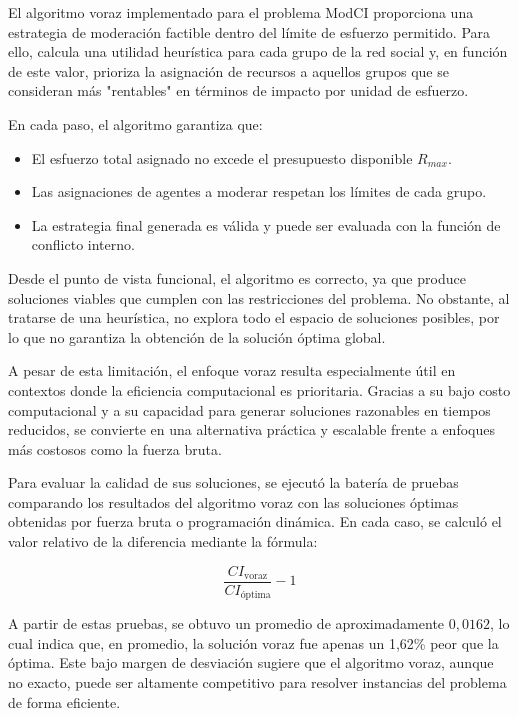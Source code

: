 \documentclass[11pt,letter]{article}
\begin{document}
    El algoritmo voraz implementado para el problema ModCI proporciona una estrategia de moderación factible dentro del límite de esfuerzo permitido. Para ello, calcula una utilidad heurística para cada grupo de la red social y, en función de este valor, prioriza la asignación de recursos a aquellos grupos que se consideran más "rentables" en términos de impacto por unidad de esfuerzo.

    En cada paso, el algoritmo garantiza que:
    \begin{itemize}
        \item El esfuerzo total asignado no excede el presupuesto disponible $R_{max}$.
        \item Las asignaciones de agentes a moderar respetan los límites de cada grupo.
        \item La estrategia final generada es válida y puede ser evaluada con la función de conflicto interno.
    \end{itemize}

    Desde el punto de vista funcional, el algoritmo es correcto, ya que produce soluciones viables que cumplen con las restricciones del problema. No obstante, al tratarse de una heurística, no explora todo el espacio de soluciones posibles, por lo que no garantiza la obtención de la solución óptima global.

    A pesar de esta limitación, el enfoque voraz resulta especialmente útil en contextos donde la eficiencia computacional es prioritaria. Gracias a su bajo costo computacional y a su capacidad para generar soluciones razonables en tiempos reducidos, se convierte en una alternativa práctica y escalable frente a enfoques más costosos como la fuerza bruta.

    Para evaluar la calidad de sus soluciones, se ejecutó la batería de pruebas comparando los resultados del algoritmo voraz con las soluciones óptimas obtenidas por fuerza bruta o programación dinámica. En cada caso, se calculó el valor relativo de la diferencia mediante la fórmula:

    \[
        \frac{CI_{\text{voraz}}}{CI_{\text{óptima}}} - 1
    \]
    \vspace{0.5cm}

    A partir de estas pruebas, se obtuvo un promedio de aproximadamente $0{,}0162$, lo cual indica que, en promedio, la solución voraz fue apenas un 1,62\% peor que la óptima. Este bajo margen de desviación sugiere que el algoritmo voraz, aunque no exacto, puede ser altamente competitivo para resolver instancias del problema de forma eficiente.
\end{document}
